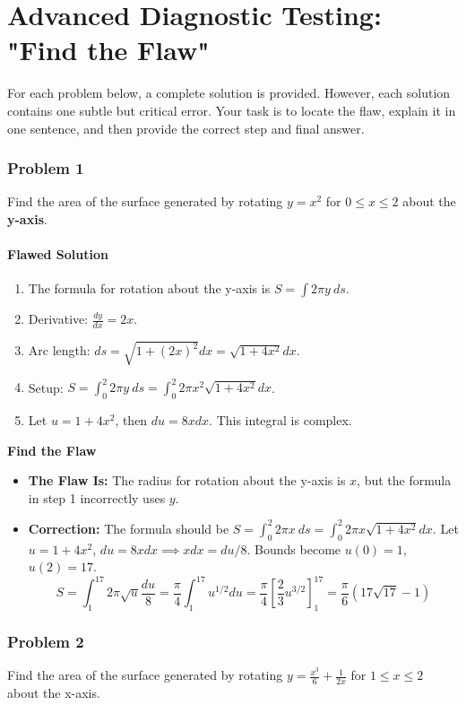 \documentclass{article}
\begin{document}
\part*{Advanced Diagnostic Testing: "Find the Flaw"}
For each problem below, a complete solution is provided. However, each solution contains one subtle but critical error. Your task is to locate the flaw, explain it in one sentence, and then provide the correct step and final answer.

\section{Problem 1}
Find the area of the surface generated by rotating \(y=x^2\) for \(0 \le x \le 2\) about the \textbf{y-axis}.
\subsection{Flawed Solution}
\begin{enumerate}
    \item The formula for rotation about the y-axis is \(S = \int 2\pi y \ ds\).
    \item Derivative: \(\frac{dy}{dx} = 2x\).
    \item Arc length: \(ds = \sqrt{1+(2x)^2}dx = \sqrt{1+4x^2}dx\).
    \item Setup: \(S = \int_0^2 2\pi y \ ds = \int_0^2 2\pi x^2 \sqrt{1+4x^2} dx\).
    \item Let \(u=1+4x^2\), then \(du=8x dx\). This integral is complex.
\end{enumerate}
\textbf{Find the Flaw}
\begin{itemize}
    \item \textbf{The Flaw Is:} The radius for rotation about the y-axis is \(x\), but the formula in step 1 incorrectly uses \(y\).
    \item \textbf{Correction:} The formula should be \(S = \int_0^2 2\pi x \ ds = \int_0^2 2\pi x \sqrt{1+4x^2} dx\). Let \(u=1+4x^2\), \(du=8xdx \implies xdx=du/8\). Bounds become \(u(0)=1\), \(u(2)=17\).
    \[ S = \int_1^{17} 2\pi \sqrt{u} \frac{du}{8} = \frac{\pi}{4} \int_1^{17} u^{1/2} du = \frac{\pi}{4} \left[\frac{2}{3}u^{3/2}\right]_1^{17} = \frac{\pi}{6}(17\sqrt{17}-1) \]
\end{itemize}

\section{Problem 2}
Find the area of the surface generated by rotating \(y=\frac{x^3}{6} + \frac{1}{2x}\) for \(1 \le x \le 2\) about the x-axis.
\end{document}
